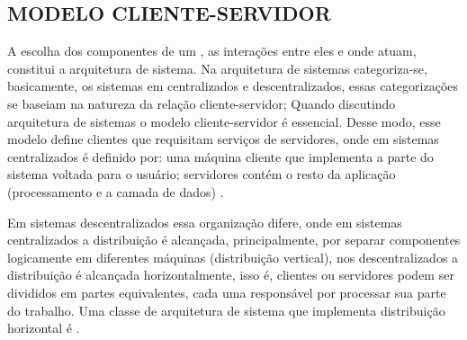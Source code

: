 
\subsection{MODELO CLIENTE-SERVIDOR}

A escolha dos componentes de um , as interações entre eles e onde atuam, constitui a arquitetura de sistema. Na arquitetura de sistemas categoriza-se, basicamente, os sistemas em centralizados e descentralizados, essas categorizações se baseiam na natureza da relação cliente-servidor; Quando discutindo arquitetura de sistemas o modelo cliente-servidor é essencial. Desse modo, esse modelo define clientes que requisitam serviços de servidores, onde em sistemas centralizados é definido por: uma máquina cliente que implementa a parte do sistema voltada para o usuário; servidores contém o resto da aplicação (processamento e a camada de dados) \cite{tanenbaum2007dist}.

Em sistemas descentralizados essa organização difere, onde em sistemas centralizados a distribuição é alcançada, principalmente, por separar componentes logicamente em diferentes máquinas (distribuição vertical), nos descentralizados a distribuição é alcançada horizontalmente, isso é, clientes ou servidores podem ser divididos em partes equivalentes, cada uma responsável por processar sua parte do trabalho. Uma classe de arquitetura de sistema que implementa distribuição horizontal é  \cite{tanenbaum2007dist}.


